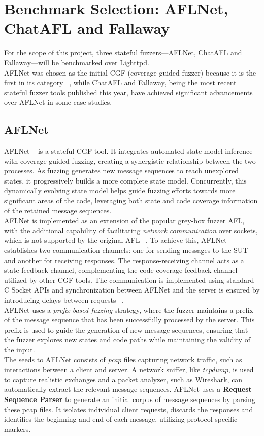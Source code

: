 \section{Benchmark Selection: AFLNet, ChatAFL and Fallaway}

For the scope of this project, three stateful fuzzers—AFLNet, ChatAFL and Fallaway—will be benchmarked over Lighttpd.
\\AFLNet was chosen as the initial CGF (coverage-guided fuzzer) because it is the first in its category ~\cite{AFLNet}, while ChatAFL and Fallaway, being the most recent stateful fuzzer tools published this year, have achieved significant advancements over AFLNet in some case studies.
 
\subsection{AFLNet}
AFLNet ~\cite{AFLNet} is a stateful CGF tool. It integrates automated state model inference with coverage-guided fuzzing, creating a synergistic relationship between the two processes. As fuzzing generates new message sequences to reach unexplored states, it progressively builds a more complete state model. Concurrently, this dynamically evolving state model helps guide fuzzing efforts towards more significant areas of the code, leveraging both state and code coverage information of the retained message sequences.
\\AFLNet is implemented as an extension of the popular grey-box fuzzer AFL, with the additional capability of facilitating \textit{network communication} over sockets, which is not supported by the original AFL ~\cite{AFLNet}. To achieve this, AFLNet establishes two communication channels: one for sending messages to the SUT and another for receiving responses. The response-receiving channel acts as a state feedback channel, complementing the code coverage feedback channel utilized by other CGF tools. The communication is implemented using standard C Socket APIs and synchronization between AFLNet and the server is ensured by introducing delays between requests ~\cite{AFLNet}.
\\AFLNet uses a \textit{prefix-based fuzzing} strategy, where the fuzzer maintains a prefix of the message sequence that has been successfully processed by the server. This prefix is used to guide the generation of new message sequences, ensuring that the fuzzer explores new states and code paths while maintaining the validity of the input.
\\The seeds to AFLNet consists of \textit{pcap} files capturing network traffic, such as interactions between a client and server. A network sniffer, like \textit{tcpdump}, is used to capture realistic exchanges and a packet analyzer, such as Wireshark, can automatically extract the relevant message sequences. AFLNet uses a \textbf{Request Sequence Parser} to generate an initial corpus of message sequences by parsing these pcap files. It isolates individual client requests, discards the responses and identifies the beginning and end of each message, utilizing protocol-specific markers.
